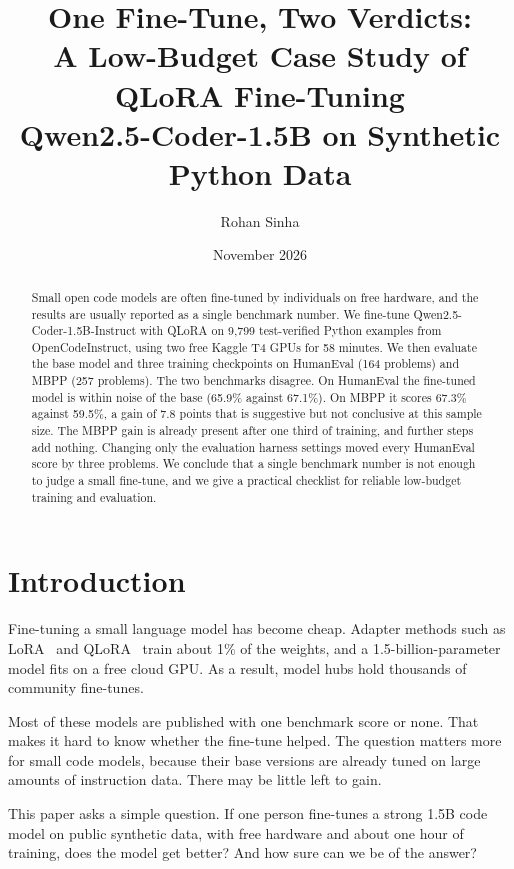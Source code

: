 \documentclass[11pt,a4paper]{article}
\title{\textbf{One Fine-Tune, Two Verdicts:\\A Low-Budget Case Study of QLoRA Fine-Tuning\\Qwen2.5-Coder-1.5B on Synthetic Python Data}}
\author{Rohan Sinha}
\date{November 2026}
\begin{document}
\maketitle

\begin{abstract}
Small open code models are often fine-tuned by individuals on free hardware, and the results are usually reported as a single benchmark number. We fine-tune Qwen2.5-Coder-1.5B-Instruct with QLoRA on 9,799 test-verified Python examples from OpenCodeInstruct, using two free Kaggle T4 GPUs for 58 minutes. We then evaluate the base model and three training checkpoints on HumanEval (164 problems) and MBPP (257 problems). The two benchmarks disagree. On HumanEval the fine-tuned model is within noise of the base (65.9\% against 67.1\%). On MBPP it scores 67.3\% against 59.5\%, a gain of 7.8 points that is suggestive but not conclusive at this sample size. The MBPP gain is already present after one third of training, and further steps add nothing. Changing only the evaluation harness settings moved every HumanEval score by three problems. We conclude that a single benchmark number is not enough to judge a small fine-tune, and we give a practical checklist for reliable low-budget training and evaluation.
\end{abstract}

\section{Introduction}
Fine-tuning a small language model has become cheap. Adapter methods such as LoRA~\cite{lora} and QLoRA~\cite{qlora} train about 1\% of the weights, and a 1.5-billion-parameter model fits on a free cloud GPU. As a result, model hubs hold thousands of community fine-tunes.

Most of these models are published with one benchmark score or none. That makes it hard to know whether the fine-tune helped. The question matters more for small code models, because their base versions are already tuned on large amounts of instruction data. There may be little left to gain.

This paper asks a simple question. If one person fine-tunes a strong 1.5B code model on public synthetic data, with free hardware and about one hour of training, does the model get better? And how sure can we be of the answer?
\end{document}
